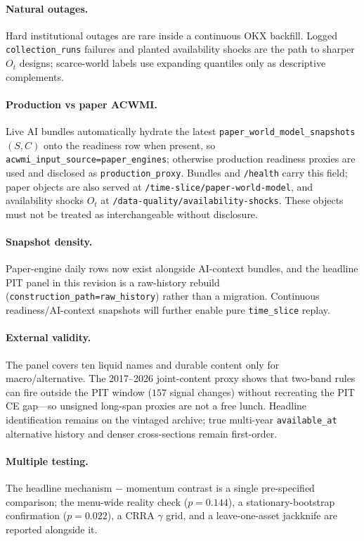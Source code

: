 \documentclass[12pt]{article}
\begin{document}
\paragraph{Natural outages.}
Hard institutional outages are rare inside a continuous OKX backfill. Logged \texttt{collection\_runs} failures and planted availability shocks are the path to sharper $O_t$ designs; scarce-world labels use expanding quantiles only as descriptive complements.

\paragraph{Production vs paper ACWMI.}
Live AI bundles automatically hydrate the latest \texttt{paper\_world\_model\_snapshots} $(S,C)$ onto the readiness row when present, so \texttt{acwmi\_input\_source=paper\_engines}; otherwise production readiness proxies are used and disclosed as \texttt{production\_proxy}. Bundles and \texttt{/health} carry this field; paper objects are also served at \texttt{/time-slice/paper-world-model}, and availability shocks $O_t$ at \texttt{/data-quality/availability-shocks}. These objects must not be treated as interchangeable without disclosure.

\paragraph{Snapshot density.}
Paper-engine daily rows now exist alongside AI-context bundles, and the headline PIT panel in this revision is a raw-history rebuild (\texttt{construction\_path=raw\_history}) rather than a migration. Continuous readiness/AI-context snapshots will further enable pure \texttt{time\_slice} replay.

\paragraph{External validity.}
The panel covers ten liquid names and durable content only for macro/alternative. The 2017--2026 joint-content proxy shows that two-band rules can fire outside the PIT window ($157$ signal changes) without recreating the PIT CE gap---so unsigned long-span proxies are not a free lunch. Headline identification remains on the vintaged archive; true multi-year \texttt{available\_at} alternative history and denser cross-sections remain first-order.

\paragraph{Multiple testing.}
The headline mechanism $-$ momentum contrast is a single pre-specified comparison; the menu-wide reality check ($p=0.144$), a stationary-bootstrap confirmation ($p=0.022$), a CRRA $\gamma$ grid, and a leave-one-asset jackknife are reported alongside it.
\end{document}
